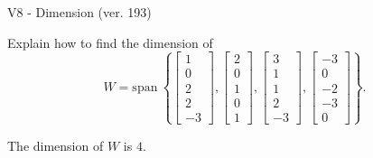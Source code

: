 \begin{exercise}
  \begin{exerciseTitle}V8 - Dimension (ver. 193)\end{exerciseTitle}
  \begin{exerciseStatement}
    Explain how to find the dimension of 
\[W=\mathrm{span}\ \left\{\left[\begin{array}{r}
1 \\
0 \\
2 \\
2 \\
-3
\end{array}\right] , \left[\begin{array}{r}
2 \\
0 \\
1 \\
0 \\
1
\end{array}\right] , \left[\begin{array}{r}
3 \\
1 \\
1 \\
2 \\
-3
\end{array}\right] , \left[\begin{array}{r}
-3 \\
0 \\
-2 \\
-3 \\
0
\end{array}\right]\right\}.\]



  \end{exerciseStatement}
  \begin{exerciseAnswer}
   The dimension of \(W\) is  \(4\).
  


  \end{exerciseAnswer}
\end{exercise}